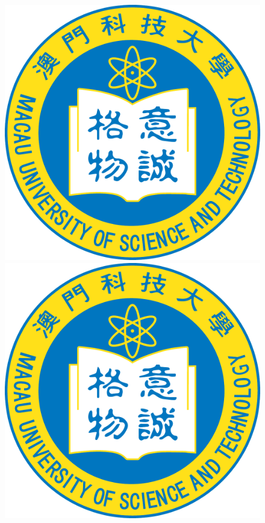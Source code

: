 \documentclass[12pt, a4paper]{report}
\begin{document}
\begin{figure}[!htbp]
	\begin{minipage}[t]{0.5\linewidth}
		\centering
		\includegraphics[width=\textwidth]{figure/MUSTSchoolBadgecolor.pdf}
	\end{minipage}
	\begin{minipage}[t]{0.5\linewidth}
		\centering
		\includegraphics[width=\textwidth]{figure/MUSTSchoolBadgecolor.pdf}

\end{minipage}
\end{figure}
\end{document}
